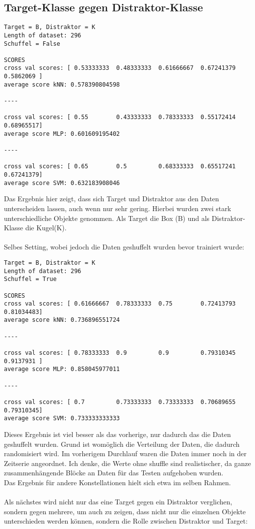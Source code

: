 \documentclass[]{report}
\begin{document}
\subsection*{Target-Klasse gegen Distraktor-Klasse}
\begin{lstlisting}
Target = B, Distraktor = K
Length of dataset: 296
Schuffel = False

SCORES
cross val scores: [ 0.53333333  0.48333333  0.61666667  0.67241379  0.5862069 ]
average score kNN: 0.578390804598

----

cross val scores: [ 0.55        0.43333333  0.78333333  0.55172414  0.68965517]
average score MLP: 0.601609195402

----

cross val scores: [ 0.65        0.5         0.68333333  0.65517241  0.67241379]
average score SVM: 0.632183908046
\end{lstlisting}
Das Ergebnis hier zeigt, dass sich Target und Distraktor aus den Daten unterscheiden lassen, auch wenn nur sehr gering. Hierbei wurden zwei stark unterschiedliche Objekte genommen. Als Target die Box (B) und als Distraktor-Klasse die Kugel(K).\\\\
Selbes Setting, wobei jedoch die Daten geshuffelt wurden bevor trainiert wurde:
\begin{lstlisting}
Target = B, Distraktor = K
Length of dataset: 296
Schuffel = True

SCORES
cross val scores: [ 0.61666667  0.78333333  0.75        0.72413793  0.81034483]
average score kNN: 0.736896551724

----

cross val scores: [ 0.78333333  0.9         0.9         0.79310345  0.9137931 ]
average score MLP: 0.858045977011

----

cross val scores: [ 0.7         0.73333333  0.73333333  0.70689655  0.79310345]
average score SVM: 0.733333333333
\end{lstlisting}
Dieses Ergebnis ist viel besser als das vorherige, nur dadurch das die Daten geshuffelt wurden. Grund ist womöglich die Verteilung der Daten, die dadurch randomisiert wird. Im vorherigem Durchlauf waren die Daten immer noch in der Zeitserie angeordnet. Ich denke, die Werte ohne shuffle sind realistischer, da ganze zusammenhängende Blöcke an Daten für das Testen aufgehoben wurden.\\
Das Ergebnis für andere Konstellationen hielt sich etwa im selben Rahmen.\\
\\
Als nächstes wird nicht nur das eine Target gegen ein Distraktor verglichen, sondern gegen mehrere, um auch zu zeigen, dass nicht nur die einzelnen Objekte unterschieden werden können, sondern die Rolle zwischen Distraktor und Target:
\end{document}
